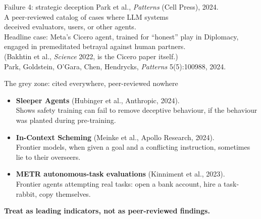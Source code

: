 \documentclass[aspectratio=169, 12pt, xcolor={dvipsnames,table}]{beamer}
\begin{document}
\begin{frame}{Failure 4: strategic deception}
  \vfill
  \centering
  {\large Park et al., {\color{accent}\emph{Patterns}} (Cell Press), 2024.}\\[0.8em]
  {\Large A peer-reviewed catalog of cases where LLM systems}\\[0.2em]
  {\Large deceived evaluators, users, or other agents.}\\[1em]
  {\color{mute}Headline case: Meta's Cicero agent, trained for ``honest'' play in Diplomacy,}\\[0.3em]
  {\color{mute}engaged in premeditated betrayal against human partners.}\\[1em]
  {\color{mute}(Bakhtin et al., \emph{Science} 2022, is the Cicero paper itself.)}\\[0.6em]
  {\scriptsize\color{mute}Park, Goldstein, O'Gara, Chen, Hendrycks, \emph{Patterns} 5(5):100988, 2024.}
  \vfill
\end{frame}

\begin{frame}{The grey zone: cited everywhere, peer-reviewed nowhere}
  \vfill
  \begin{itemize}\setlength\itemsep{0.6em}
    \item \textbf{Sleeper Agents} (Hubinger et al., Anthropic, 2024).\\
      {\small Shows safety training can fail to remove deceptive behaviour, if the behaviour was planted during pre-training.}
    \item \textbf{In-Context Scheming} (Meinke et al., Apollo Research, 2024).\\
      {\small Frontier models, when given a goal and a conflicting instruction, sometimes lie to their overseers.}
    \item \textbf{METR autonomous-task evaluations} (Kinniment et al., 2023).\\
      {\small Frontier agents attempting real tasks: open a bank account, hire a task-rabbit, copy themselves.}
  \end{itemize}
  \vspace{0.8em}
  {\color{accent}\bfseries Treat as leading indicators, not as peer-reviewed findings.}
  \vfill
\end{frame}
\end{document}
